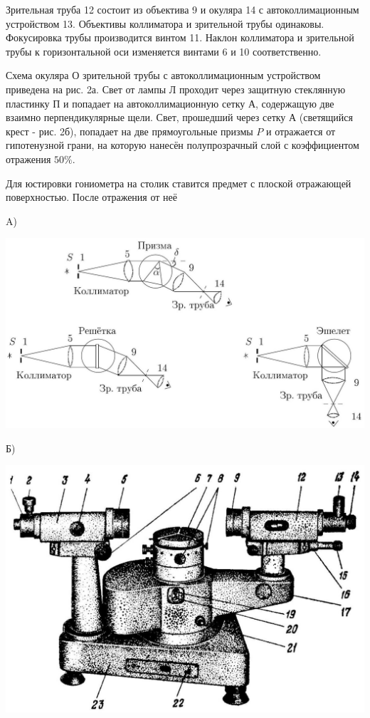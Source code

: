 \documentclass[a4paper, 12pt]{article}
\begin{document}
Зрительная труба 12 состоит из объектива 9 и окуляра 14 с автоколлимационным устройством 13. Объективы коллиматора и зрительной трубы одинаковы. Фокусировка трубы производится винтом 11. Наклон коллиматора и зрительной трубы к горизонтальной оси изменяется винтами 6 и 10 соответственно.

Схема окуляра О зрительной трубы с автоколлимационным устройством приведена на рис. 2а. Свет от лампы Л проходит через защитную стеклянную пластинку П и попадает на автоколлимационную сетку А, содержащую две взаимно перпендикулярные щели. Свет, прошедший через сетку А (светящийся крест - рис. 2б), попадает на две прямоугольные призмы $P$ и отражается от гипотенузной грани, на которую нанесён полупрозрачный слой с коэффициентом отражения $50 \%$.

Для юстировки гониометра на столик ставится предмет с плоской отражающей поверхностью. После отражения от неё 

A)
\begin{center}
    \includegraphics[scale=0.2]{2023_04_02_a48ae02e429ba186bcd7g-2}
\end{center}


Б)

\begin{center}
\includegraphics[scale=0.2]{2023_04_02_a48ae02e429ba186bcd7g-2(2)}
\end{center}
\end{document}
